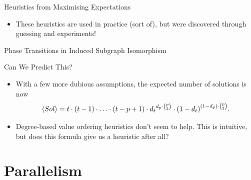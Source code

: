\documentclass{beamer}
\begin{document}
\begin{frame}{Heuristics from Maximising Expectations}
{

        \begin{itemize}
            \item These heuristics are used in practice (sort of), but were discovered through
                guessing and experiments!
        \end{itemize}
    }

\end{frame}

\begin{frame}{Phase Transitions in Induced Subgraph Isomorphism}

     {
        
    }

     {
        
    }

     {
        
    }

     {
        \centering
        
    }

\end{frame}

\begin{frame}{Can We Predict This?}

     {
        \begin{itemize}
            \item With a few more dubious assumptions, the expected
                number of solutions is now \[ \langle Sol \rangle = t \cdot (t - 1) \cdot \ldots
                    \cdot (t - p + 1) \cdot {d_t}^{d_p \cdot \binom{p}{2}} \cdot {(1 - d_t)}^{(1 -
                        d_p) \cdot \binom{p}{2}} \textnormal{.} \]
            \item Degree-based value ordering heuristics don't seem to help. This is intuitive, but
                does this formula give us a heuristic after all?
        \end{itemize}
    }

     {
        
    }

\end{frame}

\section{Parallelism}
\end{document}

